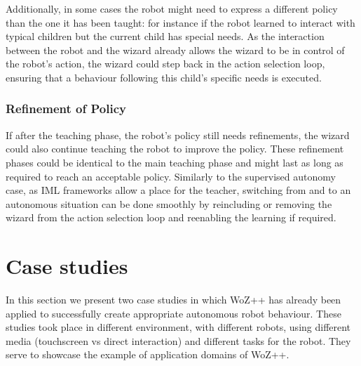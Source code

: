 \documentclass[manuscript, review, anonymous]{acmart}
\newcommand{\ES}[1]{\added[id=ES]{#1}}
\newcommand{\woz}{WoZ++\xspace}
\begin{document}
Additionally, in some cases the robot might need to express a different policy
than the one it has been taught: for instance if the robot learned to interact
with typical children but the current child has special needs. As the
interaction between the robot and the wizard already allows the wizard to be in
control of the robot's action, the wizard could  step back in the
action selection loop, ensuring that a behaviour following this child's specific
needs is executed.

\subsubsection{Refinement of Policy}

If after the teaching phase, the robot's policy still needs refinements, the
wizard could also continue teaching the robot to improve the policy. These
refinement phases could be identical to the main teaching phase and might last
as long as required to reach an acceptable policy. Similarly to the supervised
autonomy case, as IML frameworks allow a place for the teacher, switching from
and to an autonomous situation can be done smoothly by reincluding or removing
the wizard from the action selection loop and reenabling the learning if
required. 



\section{Case studies}
In this section we present two case studies in which \woz has already been applied to successfully create appropriate autonomous robot behaviour. These studies took place in different environment, with different robots, using different media (touchscreen vs direct interaction) and different tasks for the robot. They serve to showcase the example of application domains of \woz.
\end{document}
